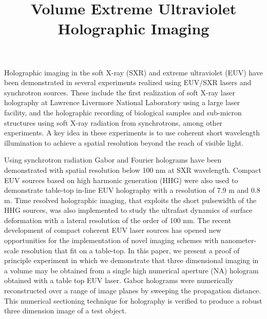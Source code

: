 \documentclass[12pt]{article}
\title{Volume Extreme Ultraviolet Holographic Imaging}
\begin{document}
\maketitle
 Holographic imaging in the soft X-ray (SXR) and extreme ultraviolet (EUV) have been demonstrated in several experiments realized using EUV/SXR lasers and synchrotron sources. These include the first realization of soft X-ray laser holography at Lawrence Livermore National Laboratory using a large laser facility, and the holographic recording of biological samples and sub-micron structures using soft X-ray radiation from synchrotrons, among other experiments.  A key idea in these experiments is to use coherent short wavelength illumination to achieve a spatial resolution beyond the reach of visible light.  

Using synchrotron radiation Gabor and Fourier holograms have been demonstrated with spatial resolution below 100 nm at SXR wavelength.  Compact EUV sources based on high harmonic generation (HHG) were also used to demonstrate table-top in-line EUV holography with a resolution of 7.9 m and 0.8 m.  Time resolved holographic imaging, that exploits the short pulsewidth of the HHG sources, was also implemented to study the ultrafast dynamics of surface deformation with a lateral resolution of the order of 100 nm.  The recent development of compact coherent EUV laser sources has opened new opportunities for the implementation of novel imaging schemes with nanometer-scale resolution that fit on a table-top. In this paper, we present a proof of principle experiment in which we demonstrate that three dimensional imaging in a volume may be obtained from a single high numerical  aperture (NA) hologram obtained with a table top EUV laser. Gabor holograms were numerically reconstructed over a range of image planes by sweeping the propagation distance. This numerical sectioning technique for holography is verified to produce a robust three dimension image of a test object. 
\end{document}

